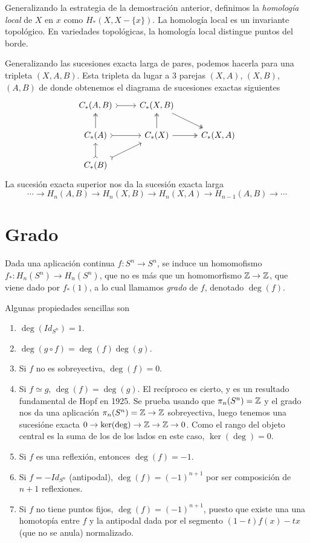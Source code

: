 \documentclass[TA.tex]{subfiles}
\begin{document}
Generalizando la estrategia de la demostración anterior, definimos la \emph{homología local} de $X$ en $x$ como $H_*(X, X-\{x\})$. La homología local es un invariante topológico. En variedades topológicas, la homología local distingue puntos del borde.


Generalizando las sucesiones exacta larga de pares, podemos hacerla para una tripleta $(X,A,B)$. Esta tripleta da lugar a 3 parejas $(X,A)$, $(X,B)$, $(A,B)$ de donde obtenemos el diagrama de sucesiones exactas siguientes
\[
\begin{tikzcd}
C_*(A,B)\arrow[r, rightarrowtail] & C_*(X,B)\arrow[dr, twoheadrightarrow]&\\
C_*(A)\arrow[r, rightarrowtail] \arrow[u,twoheadrightarrow] & C_*(X)\arrow[r, twoheadrightarrow] \arrow[u,twoheadrightarrow]& C_*(X,A)\\
C_*(B)\arrow[u, rightarrowtail]\arrow[ur, rightarrowtail]& & 
\end{tikzcd}
\]
La sucesión exacta superior nos da la sucesión exacta larga
\[
\cdots\to H_n(A,B)\to H_n(X,B)\to H_n(X,A)\to H_{n-1}(A,B)\to\cdots
\]


\section{Grado}
Dada una aplicación continua $f:S^n\to S^n$, se induce un homomofismo $f_*:H_n(S^n)\to H_n(S^n)$, que no es más que un homomorfismo $\mathbb{Z}\to\mathbb{Z}$, que viene dado por $f_*(1)$, a lo cual llamamos \emph{grado} de $f$, denotado $\deg(f)$. 
\begin{propi}
Algunas propiedades sencillas son
\begin{enumerate}
\item $\deg(Id_{S^n})=1$.
\item $\deg(g\circ f)=\deg(f)\deg(g)$.
\item Si $f$ no es sobreyectiva, $\deg(f)=0$. 
\item Si $f\simeq g$, $\deg(f)=\deg(g)$. El recíproco es cierto, y es un resultado fundamental de Hopf en 1925. Se prueba usando que $\pi_n(S^n)=\mathbb{Z}$ y el grado nos da una aplicación $\pi_n(S^n)=\mathbb{Z}\to\mathbb{Z}$ sobreyectiva, luego tenemos una sucesióne exacta $0\to\ker(\deg)\to \mathbb{Z}\to\mathbb{Z}\to 0$. Como el rango del objeto central es la suma de los de los lados en este caso, $\ker(\deg)=0$. 
\item Si $f$ es una reflexión, entonces $\deg(f)=-1$.
\item Si $f=-Id_{S^n}$ (antipodal), $\deg(f)=(-1)^{n+1}$ por ser composición de $n+1$ reflexiones.
\item Si $f$ no tiene puntos fijos, $\deg(f)=(-1)^{n+1}$, puesto que existe una una homotopía entre $f$ y la antipodal dada por el segmento $(1-t)f(x)-tx$ (que no se anula) normalizado. 
\end{enumerate}
\end{propi}
\end{document}
